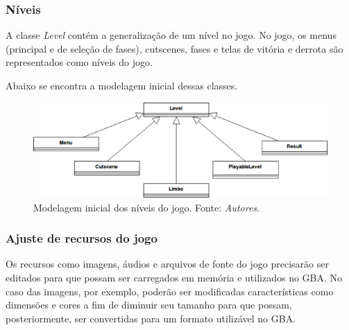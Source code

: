     \subsubsection{Níveis}

      A classe \textit{Level} contém a generalização de um nível no jogo. No jogo, os menus (principal e de seleção de fases), cutscenes, fases e telas de vitória e derrota são representados como níveis do jogo.

      Abaixo se encontra a modelagem inicial dessas classes.

      \begin{figure}[H]
        \centering \includegraphics[keepaspectratio=true,scale=0.6]{figuras/class-diagram-2.eps}
        \caption{Modelagem inicial dos níveis do jogo. Fonte: \textit{Autores}.}
        \label{game-object-levels}
      \end{figure}

    \subsubsection{Ajuste de recursos do jogo}

      Os recursos como imagens, áudios e arquivos de fonte do jogo precisarão ser editados para que possam ser carregados em memória e utilizados no GBA. No caso das imagens, por exemplo, poderão ser modificadas características como dimensões e cores a fim de diminuir seu tamanho para que possam, posteriormente, ser convertidas para um formato utilizável no GBA.

